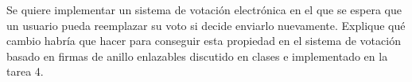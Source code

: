 Se quiere implementar un sistema de votación electrónica en el que se espera que un usuario pueda reemplazar su voto si decide enviarlo nuevamente. Explique qué cambio habría que hacer para conseguir esta propiedad en el sistema de votación basado en firmas de anillo enlazables discutido en clases e implementado en la tarea 4.
